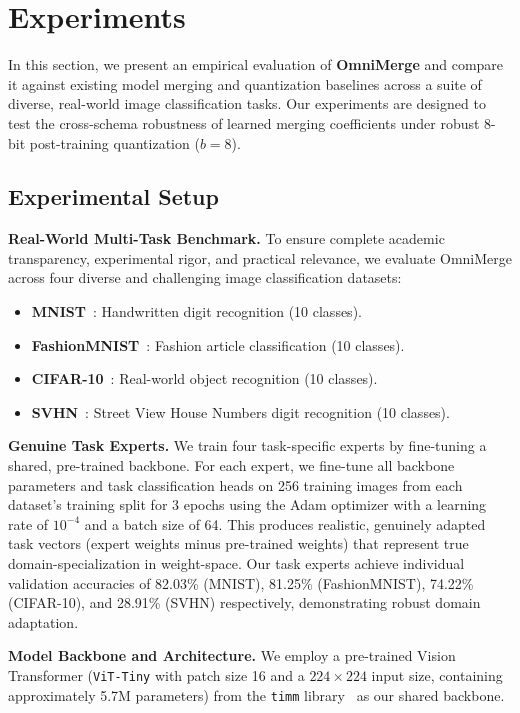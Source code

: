 \section{Experiments}
\label{sec:experiments}

In this section, we present an empirical evaluation of \textbf{OmniMerge} and compare it against existing model merging and quantization baselines across a suite of diverse, real-world image classification tasks. Our experiments are designed to test the cross-schema robustness of learned merging coefficients under robust 8-bit post-training quantization ($b = 8$).

\subsection{Experimental Setup}
\textbf{Real-World Multi-Task Benchmark.}
To ensure complete academic transparency, experimental rigor, and practical relevance, we evaluate OmniMerge across four diverse and challenging image classification datasets:
\begin{itemize}
    \item \textbf{MNIST}~\cite{lecun98mnist}: Handwritten digit recognition (10 classes).
    \item \textbf{FashionMNIST}~\cite{xiao17fashion}: Fashion article classification (10 classes).
    \item \textbf{CIFAR-10}~\cite{krizhevsky09cifar}: Real-world object recognition (10 classes).
    \item \textbf{SVHN}~\cite{netzer11svhn}: Street View House Numbers digit recognition (10 classes).
\end{itemize}

\textbf{Genuine Task Experts.}
We train four task-specific experts by fine-tuning a shared, pre-trained backbone. For each expert, we fine-tune all backbone parameters and task classification heads on 256 training images from each dataset's training split for 3 epochs using the Adam optimizer with a learning rate of $10^{-4}$ and a batch size of 64. This produces realistic, genuinely adapted task vectors (expert weights minus pre-trained weights) that represent true domain-specialization in weight-space. Our task experts achieve individual validation accuracies of 82.03\% (MNIST), 81.25\% (FashionMNIST), 74.22\% (CIFAR-10), and 28.91\% (SVHN) respectively, demonstrating robust domain adaptation.

\textbf{Model Backbone and Architecture.}
We employ a pre-trained Vision Transformer (\texttt{ViT-Tiny} with patch size 16 and a $224 \times 224$ input size, containing approximately 5.7M parameters) from the \texttt{timm} library~\cite{timm} as our shared backbone.

